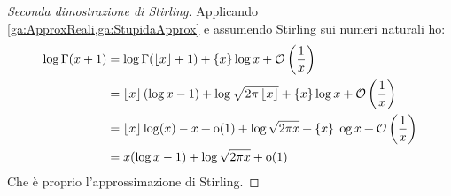 \begin{proof}[Seconda dimostrazione di Stirling]
	Applicando \cref{ga:ApproxReali,ga:StupidaApprox} e assumendo Stirling sui numeri naturali ho:
	\begin{equation*}\begin{split}
		\log{\Gamma(x+1)}&=\log\Gamma(\left\lfloor x \right\rfloor+1)+\{x\}\log{x}+\mathcal{O}\left(\frac 1x\right)\\
		&=\left\lfloor x \right\rfloor\left(\log{x}-1\right)+\log{\sqrt{2\pi\ensuremath{\left\lfloor x \right\rfloor}}}+\{x\}\log{x}+\mathcal{O}\left(\frac 1x\right)\\
		&=\left\lfloor x \right\rfloor \log(x)-x+\mathrm{o}(1)+\log{\sqrt{2\pi x}}+\{x\}\log{x}+\mathcal{O}\left(\frac 1x\right)\\
		&=x(\log{x}-1)+\log{\sqrt{2\pi x}}+\mathrm{o}(1)
	\end{split}\end{equation*}
	Che è proprio l'approssimazione di Stirling.
\end{proof}







